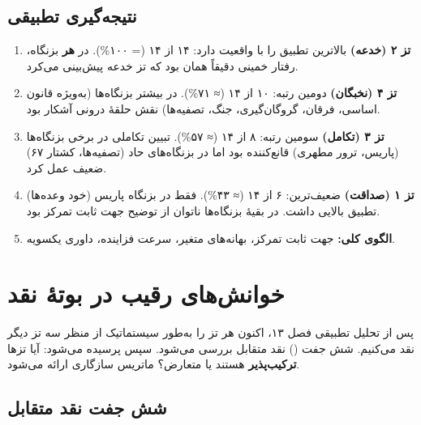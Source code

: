 \documentclass[12pt,a4paper]{book}
\newcommand{\keyword}[1]{\textbf{\textcolor{cPrimary}{#1}}}
\newcommand{\en}[1]{\lr{\textit{#1}}}
\begin{document}
\section{نتیجه‌گیری تطبیقی}

\begin{principleBox}
\begin{enumerate}[label=\textcolor{cPrimary}{\bfseries\arabic*.}, rightmargin=2em]
    \item \textbf{تز ۲ (خدعه)} بالاترین تطبیق را با واقعیت دارد: ۱۴ از ۱۴ (= ۱۰۰\%). در \keyword{هر} بزنگاه، رفتار خمینی دقیقاً همان بود که تز خدعه پیش‌بینی می‌کرد.
    \item \textbf{تز ۴ (نخبگان)} دومین رتبه: ۱۰ از ۱۴ (≈ ۷۱\%). در بیشتر بزنگاه‌ها (به‌ویژه قانون اساسی، فرقان، گروگان‌گیری، جنگ، تصفیه‌ها) نقش حلقهٔ درونی آشکار بود.
    \item \textbf{تز ۳ (تکامل)} سومین رتبه: ۸ از ۱۴ (≈ ۵۷\%). تبیین تکاملی در برخی بزنگاه‌ها (پاریس، ترور مطهری) قانع‌کننده بود اما در بزنگاه‌های حاد (تصفیه‌ها، کشتار ۶۷) ضعیف عمل کرد.
    \item \textbf{تز ۱ (صداقت)} ضعیف‌ترین: ۶ از ۱۴ (≈ ۴۳\%). فقط در بزنگاه پاریس (خود وعده‌ها) تطبیق بالایی داشت. در بقیهٔ بزنگاه‌ها ناتوان از توضیح جهت ثابت تمرکز بود.
    \item \keyword{الگوی کلی:} جهت ثابت تمرکز، بهانه‌های متغیر، سرعت فزاینده، داوری یکسویه.
\end{enumerate}
\end{principleBox}


\chapter{خوانش‌های رقیب در بوتهٔ نقد}

\begin{infoBox}
پس از تحلیل تطبیقی فصل ۱۳، اکنون هر تز را به‌طور سیستماتیک از منظر سه تز دیگر نقد می‌کنیم. شش جفت (\en{pair}) نقد متقابل بررسی می‌شود. سپس پرسیده می‌شود: آیا تزها \keyword{ترکیب‌پذیر} هستند یا متعارض؟ ماتریس سازگاری ارائه می‌شود.
\end{infoBox}

\section{شش جفت نقد متقابل}
\end{document}
